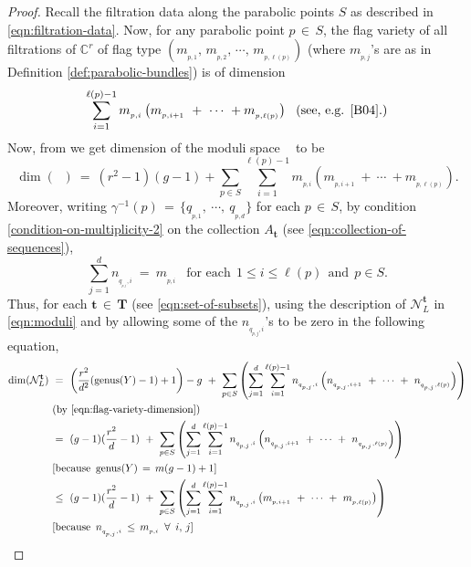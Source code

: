 \documentclass[10pt,reqno]{amsart}
\DeclareMathOperator{\Malpha}{\mc{M}^{\boldsymbol{m,\alpha}}_X(r,\ \xi)}
\newcommand{\mc}[1]{\mathcal{#1}}
\newcommand{\bb}[1]{\mathbb{#1}}
\theoremstyle{myroman}
\numberwithin{equation}{section}
\begin{document}
		\begin{proof}
			Recall the filtration data along the parabolic points $S$ as described in \eqref{eqn:filtration-data}. Now, for
			any parabolic point $p\,\in\, S$, the flag variety of all filtrations of $\bb{C}^r$ of flag type
			$(m_{_{p,1}} ,\, m_{_{p,2}},\, \cdots ,\, m_{_{p,\ell(p)}})$ (where $m_{_{p,j}}$'s are as in Definition \ref{def:parabolic-bundles}) is of dimension
			\begin{equation}\label{eqn:flag-variety-dimension}
				\sum_{i=1}^{\ell(p)-1}m_{_{p,i}}\left(m_{_{p,i+1}}\ +\  \cdots\ +m_{_{p,\ell(p)}}\right)\ \ 
				(\text{see, e.g. \cite[2.1]{B04}}.)
			\end{equation}
			Now, from \cite{MS80} we get dimension of the moduli space $\Malpha$ to be
			$$\dim\left(\Malpha\right)\ = \ (r^2-1)(g-1)+\sum_{p\in S}\sum_{i=1}^{\ell(p)-1}m_{_{p,i}}\left(m_{_{p,i+1}}\ 
			+\  \cdots\ +m_{_{p,\ell(p)}}\right).$$
			Moreover, writing $\gamma^{-1}(p)\,=\,\{q_{_{p,1}},\ \cdots, \ q_{_{p,d}}\}$ for each $p\,\in\, S$, by
			condition \eqref{condition-on-multiplicity-2} on the collection $A_{\textbf{t}}$
			(see \eqref{eqn:collection-of-sequences}),
			\begin{equation*}
				\sum_{j=1}^{d} n_{_{q_{_{p,j}},i}}\ =\ m_{_{p,i}}\ \ \text{ for each}\ \  1\leq i\leq \ell(p)\ \ \text{and}\ \ p\in S.
			\end{equation*} 
			Thus, for each $\textbf{t}\,\in\, \boldsymbol{T}$ (see \eqref{eqn:set-of-subsets}), using the description
			of $\mc{N}^\textbf{t}_L$ in \eqref{eqn:moduli} and by allowing some of the $n_{_{q_{p,j},i}}$'s to be zero
			in the following equation,
			\begin{align*}
				\dim(\mc{N}^\textbf{t}_L)\ &=\ \left(\frac{r^2}{d^2}(\text{genus}(Y)-1)+1\right)-g\ +\
				\sum_{p\in S}\left(\sum_{j=1}^{d} \sum_{i=1}^{\ell(p)-1} n_{_{{q_{_{p,j}},i}}}\left(n_{_{q_{_{p,j}},i+1}}\
				+\ \cdots\ +\  n_{_{q_{_{p,j}},\ell(p)}}\right)\right)\nonumber\\
				& (\text{by \eqref{eqn:flag-variety-dimension}})\nonumber\\
				&= \ (g-1)(\frac{r^2}{d}-1)\ +\ \sum_{p\in S}\left(\sum_{j=1}^{d} \sum_{i=1}^{\ell(p)-1}
				n_{_{{q_{_{p,j}},i}}}\left(n_{_{q_{_{p,j}},i+1}}\ +\ \cdots\ +\  n_{_{q_{_{p,j}},\ell(p)}}\right)\right)\nonumber\\
				& [\text{because}\ \, \text{genus}(Y)\,=\,m(g-1)+1]\nonumber\\
				&\leq \ (g-1)(\frac{r^2}{d}-1)\ +\ \sum_{p\in S}\left(\sum_{j=1}^{d} \sum_{i=1}^{\ell(p)-1} n_{_{q_{_{p,j}},i}}
				\left(m_{_{p,i+1}}\ +\ \cdots\ +\  m_{_{p,\ell(p)}}\right)\right)\nonumber\\
				& [\text{because}\ \, n_{_{q_{_{p,j}},i}}\, \leq\, m_{_{p,i}}\ \, \forall \ \,i,\,j]\nonumber
			\end{align*}
			

\end{proof}
\end{document}
